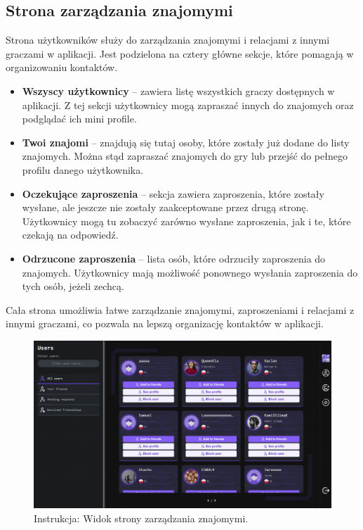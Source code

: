 \documentclass[12pt,a4paper]{article}
\begin{document}
\subsection{Strona zarządzania znajomymi}
Strona użytkowników służy do zarządzania znajomymi i relacjami z innymi graczami w aplikacji. Jest podzielona na cztery główne sekcje, które pomagają w organizowaniu kontaktów.

\begin{itemize}
    \item \textbf{Wszyscy użytkownicy} – zawiera listę wszystkich graczy dostępnych w aplikacji. Z tej sekcji użytkownicy mogą zapraszać innych do znajomych oraz podglądać ich mini profile.
    \item \textbf{Twoi znajomi} – znajdują się tutaj osoby, które zostały już dodane do listy znajomych. Można stąd zapraszać znajomych do gry lub przejść do pełnego profilu danego użytkownika.
    \item \textbf{Oczekujące zaproszenia} – sekcja zawiera zaproszenia, które zostały wysłane, ale jeszcze nie zostały zaakceptowane przez drugą stronę. Użytkownicy mogą tu zobaczyć zarówno wysłane zaproszenia, jak i te, które czekają na odpowiedź.
    \item \textbf{Odrzucone zaproszenia} – lista osób, które odrzuciły zaproszenia do znajomych. Użytkownicy mają możliwość ponownego wysłania zaproszenia do tych osób, jeżeli zechcą.
\end{itemize}

\noindent
Cała strona umożliwia łatwe zarządzanie znajomymi, zaproszeniami i relacjami z innymi graczami, co pozwala na lepszą organizację kontaktów w aplikacji.

\vspace{0.5cm}
\begin{figure}[h!]
    \centering
    \includegraphics[width=1\textwidth]{images/ins_users.png}
    \caption{Instrukcja: Widok strony zarządzania znajomymi.}
\end{figure}
\end{document}
